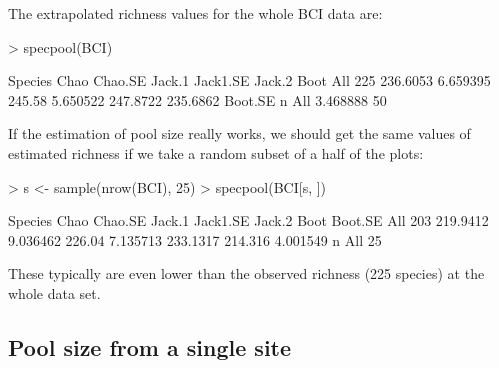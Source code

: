 \documentclass[a4paper,10pt]{amsart}
\begin{document}
The extrapolated richness values for the whole BCI data are:
\begin{Schunk}
\begin{Sinput}
> specpool(BCI)
\end{Sinput}
\begin{Soutput}
    Species     Chao  Chao.SE Jack.1 Jack1.SE   Jack.2     Boot
All     225 236.6053 6.659395 245.58 5.650522 247.8722 235.6862
     Boot.SE  n
All 3.468888 50
\end{Soutput}
\end{Schunk}
If the estimation of pool size really works, we should get the same
values of estimated richness if we take a random subset of a half of
the plots:
\begin{Schunk}
\begin{Sinput}
> s <- sample(nrow(BCI), 25)
> specpool(BCI[s, ])
\end{Sinput}
\begin{Soutput}
    Species     Chao  Chao.SE Jack.1 Jack1.SE   Jack.2    Boot  Boot.SE
All     203 219.9412 9.036462 226.04 7.135713 233.1317 214.316 4.001549
     n
All 25
\end{Soutput}
\end{Schunk}
These typically are even lower than the observed richness
(225 species) at the whole data set.

\subsection{Pool size from a single site}
\end{document}
